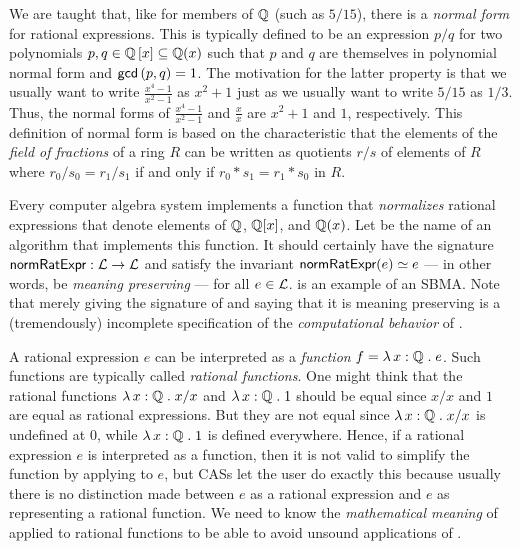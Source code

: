 \documentclass[fleqn]{llncs}
\begin{document}
We are taught that, like for members of $\mathbb{Q}$ (such as $5/15$), there
is a \emph{normal form} for rational expressions. This is typically
defined to be an expression $p/q$ for two polynomials $p,q \in
\mathbb{Q}\left[x\right] \subseteq \mathbb{Q}(x)$ such that $p$ and $q$ are
themselves in polynomial normal form and $\mbox{\sf gcd}\left(p,q\right)
= 1$.  The motivation for the latter property is that we usually want
to write $\frac{x^4-1}{x^2-1}$ as $x^2 + 1$ just as we usually want to
write $5/15$ as $1/3$.  Thus, the normal forms of
$\frac{x^4-1}{x^2-1}$ and $\frac{x}{x}$ are $x^2 + 1$ and $1$,
respectively.  This definition of normal form is based on the
characteristic that the elements of the \emph{field of fractions} of a
ring $R$ can be written as quotients $r/s$ of elements of $R$ where
$r_0/s_0 = r_1/s_1$ if and only if $r_0 * s_1 = r_1 * s_0$ in $R$.

Every computer algebra system implements a function that
\emph{normalizes} rational expressions that denote elements of $\mathbb{Q}$,
$\mathbb{Q}[x]$, and $\mathbb{Q}(x)$.  Let {\NRE} be the name of an algorithm that
implements this function.  It should certainly have the signature
$\mbox{\sf normRatExpr} : \mathcal{L} \rightarrow \mathcal{L}$ and satisfy the invariant $\mbox{\sf normRatExpr}(e)
\simeq e$ --- in other words, be \emph{meaning preserving} --- for all
$e \in \mathcal{L}$.  {\NRE} is an example of an SBMA.  Note that merely
giving the signature of {\NRE} and saying that it is meaning
preserving is a (tremendously) incomplete specification of the
\emph{computational behavior} of {\NRE}.

\iffalse
SBMAs can be difficult to specify since they involve an interplay of
syntax and semantics.  We have to be careful of \emph{which} semantics
is used to guide the syntactic manipulations, as different semantics
for the \textbf{same} expression can be inconsistent.
\fi

A rational expression $e$ can be interpreted as a \emph{function} $f =
\lambda\, x : \mathbb{Q} \mathrel. e$.  Such functions are typically called
\emph{rational functions}.  One might think that the rational
functions $\lambda\, x : \mathbb{Q} \mathrel. x/x$ and $\lambda\, x : \mathbb{Q} \mathrel.1$ should be equal since $x/x$ and
$1$ are equal as rational expressions.  But they are not equal since
$\lambda\, x : \mathbb{Q} \mathrel. x/x$ is undefined at 0, while $\lambda\, x : \mathbb{Q} \mathrel.1$ is defined
everywhere.  Hence, if a rational expression $e$ is interpreted as a
function, then it is not valid to simplify the function by applying
{\NRE} to $e$, but CASs let the user do exactly this because usually
there is no distinction made between $e$ as a rational expression and
$e$ as representing a rational function.  We need to know the
\emph{mathematical meaning} of {\NRE} applied to rational functions to
be able to avoid unsound applications of {\NRE}.
\end{document}
